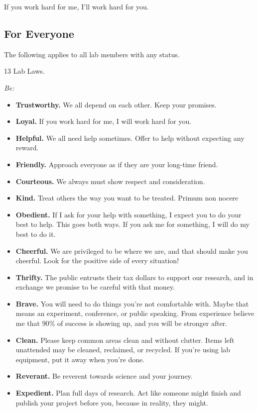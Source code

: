 \documentclass[
]{book}
\providecommand{\tightlist}{%
  \setlength{\itemsep}{0pt}\setlength{\parskip}{0pt}}
\begin{document}
If you work hard for me, I'll work hard for you.

\hypertarget{for-everyone}{%
\subsection{For Everyone}\label{for-everyone}}

The following applies to all lab members with any status.

13 Lab Laws.

\emph{Be:}

\begin{itemize}
\tightlist
\item
  \textbf{Trustworthy.} We all depend on each other. Keep your promises.
\item
  \textbf{Loyal.} If you work hard for me, I will work hard for you.
\item
  \textbf{Helpful.} We all need help sometimes. Offer to help without expecting any reward.
\item
  \textbf{Friendly.} Approach everyone as if they are your long-time friend.
\item
  \textbf{Courteous.} We always must show respect and consideration.\\
\item
  \textbf{Kind.} Treat others the way you want to be treated. Primum non nocere
\item
  \textbf{Obedient.} If I ask for your help with something, I expect you to do your best to help. This goes both ways. If you ask me for something, I will do my best to do it.
\item
  \textbf{Cheerful.} We are privileged to be where we are, and that should make you cheerful. Look for the positive side of every situation!
\item
  \textbf{Thrifty.} The public entrusts their tax dollars to support our research, and in exchange we promise to be careful with that money.
\item
  \textbf{Brave.} You will need to do things you're not comfortable with. Maybe that means an experiment, conference, or public speaking. From experience believe me that 90\% of success is showing up, and you will be stronger after.
\item
  \textbf{Clean.} Please keep common areas clean and without clutter. Items left unattended may be cleaned, reclaimed, or recycled. If you're using lab equipment, put it away when you're done.
\item
  \textbf{Reverant.} Be reverent towards science and your journey.
\item
  \textbf{Expedient.} Plan full days of research. Act like someone might finish and publish your project before you, because in reality, they might.
\end{itemize}
\end{document}

